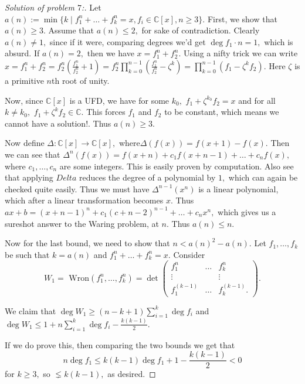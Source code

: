 \documentclass[letterpaper,11pt,twoside]{article}
\theoremstyle{proposition}
\theoremstyle{definition}
\theoremstyle{theorem}
\theoremstyle{definition}
\theoremstyle{definition}
\theoremstyle{definition}
\theoremstyle{lemma}
\theoremstyle{definition}
\theoremstyle{definition}
\theoremstyle{corollary}
\theoremstyle{definition}
\theoremstyle{definition}
\theoremstyle{definition}
\renewcommand{\div}{\;\vert\;}
\begin{document}
	\begin{proof}[Solution of problem $7$:]
	Let $a(n):= \min\{k \div f_1^n+ \dots + f_k^n = x, f_i \in \mathbb{C}[x], n \geq 3\}.$ First, we show that $a(n) \geq 3.$ Assume that $a(n) \leq 2,$ for 
	sake of contradiction. Clearly $a(n) \neq 1,$ since if it were, comparing degrees we'd get $\deg f_1 \cdot n = 1,$ which is absurd. If $a(n)=2,$ then we 
	have $x= f_1^n + f_2^n.$ Using a nifty trick we can write $x= f_1^n + f_2^n = f_2^n\left( \frac{f_1^n}{f_2^n}+ 1 \right)= f_2^n \prod_{k=0}^{n-1}\left( 
	\frac{f_1^n}{f_2^n} - \zeta^k \right)= \prod_{k=0}^{n-1}\left({f_1} - \zeta^kf_2 \right).$ Here $\zeta$ is a primitive $n$th root of unity. 
	
	Now, since $\mathbb{C}[x]$ is a UFD, we have for some $k_0,$ $f_1+ \zeta^{k_0}f_2 = x$ and for all $k \neq k_0,$ $f_1+\zeta^kf_2 \in \mathbb{C}.$ This 
	forces $f_1$ and $f_2$ to be constant, which means we cannot have a solution!. Thus $a(n) \geq 3.$
	
	Now define $\Delta: \mathbb{C}[x] \to \mathbb{C}[x],$ where$\Delta(f(x))= f(x+1)-f(x).$ Then we can see that $\Delta^n(f(x))= f(x+n) + c_1f(x+n-1) + 
	\dots + c_nf(x),$ where $c_1, \dots, c_n$ are some integers. This is easily proven by computation. Also see that applying $Delta$ reduces the degree of 
	a polynomial by $1,$ which can again be checked quite easily. Thus we must have $\Delta^{n-1}(x^n)$ is a linear polynomial, which after a linear 
	transformation becomes $x.$ Thus $ ax+b = (x+n-1)^n + c_1 (c+n-2)^{n-1}+ \dots + c_nx^n,$ which gives us a sureshot answer to the Waring problem, at $n$.
    Thus $a(n) \leq n.$
    
    Now for the last bound, we need to show that $n < a(n)^2 - a(n).$ Let $f_1, \dots , f_k$ be such that $k=a(n)$ and $f_1^n+ \dots + f_k^n = x.$ Consider 
    $$W_1=\text{ Wron} (f_1^n, \dots, f_k^n)= \det \begin{pmatrix}
    	f_1^n & \dots & f_k^n\\
    	\vdots & & \vdots \\
    	f_1^{(k-1)} & \dots & f_k^{(k-1)}.
    \end{pmatrix}.$$ 

We claim that $ \deg W_1 \geq (n-k+1)\sum_{i=1}^{k} \deg f_i $ and $ \deg W_1 \leq 1 + n \sum_{i=1}^{k}\deg f_i - \frac{k(k-1)}{2}.$ 

If we do prove this, then comparing the two bounds we get that $$n \deg f_1  \leq  k(k-1) \deg f_1 + 1 - \frac{k(k-1)}{2} <0 $$ for $k \geq 3,$ so $\lneq 
k(k-1),$ as desired. 


\end{proof}
\end{document}
